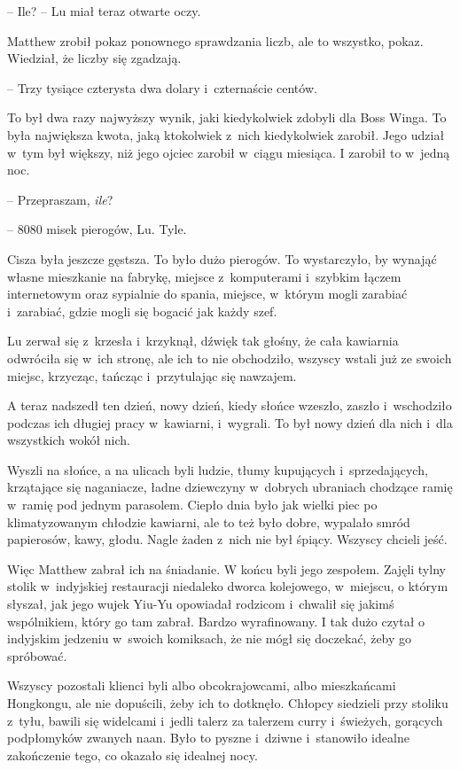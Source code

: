 \documentclass[oneside,polish,11pt,rmheadings]{mwbk}
\begin{document}
-- Ile? -- Lu miał teraz otwarte oczy. 


Matthew zrobił pokaz ponownego sprawdzania liczb, ale to wszystko, pokaz. Wiedział, że liczby się zgadzają. 

-- Trzy tysiące czterysta dwa dolary i~czternaście centów. 

To był dwa razy najwyższy wynik, jaki kiedykolwiek zdobyli dla Boss Winga. To była największa kwota, jaką ktokolwiek z~nich kiedykolwiek zarobił. Jego udział w~tym był większy, niż jego ojciec zarobił w~ciągu miesiąca. I zarobił to w~jedną noc. 


-- Przepraszam, \textit{ile}?  


-- 8080 misek pierogów, Lu. Tyle.  


Cisza była jeszcze gęstsza. To było dużo pierogów. To wystarczyło, by wynająć własne mieszkanie na fabrykę, miejsce z~komputerami i~szybkim łączem internetowym oraz sypialnie do spania, miejsce, w~którym mogli zarabiać i~zarabiać, gdzie mogli się bogacić jak każdy szef. 


Lu zerwał się z~krzesła i~krzyknął, dźwięk tak głośny, że cała kawiarnia odwróciła się w~ich stronę, ale ich to nie obchodziło, wszyscy wstali już ze swoich miejsc, krzycząc, tańcząc i~przytulając się nawzajem. 


A teraz nadszedł ten dzień, nowy dzień, kiedy słońce wzeszło, zaszło i~wschodziło podczas ich długiej pracy w~kawiarni, i~wygrali. To był nowy dzień dla nich i~dla wszystkich wokół nich. 


Wyszli na słońce, a na ulicach byli ludzie, tłumy kupujących i~sprzedających, krzątające się naganiacze, ładne dziewczyny w~dobrych ubraniach chodzące ramię w~ramię pod jednym parasolem. Ciepło dnia było jak wielki piec po klimatyzowanym chłodzie kawiarni, ale to też było dobre, wypalało smród papierosów, kawy, głodu. Nagle żaden z~nich nie był śpiący. Wszyscy chcieli jeść. 


Więc Matthew zabrał ich na śniadanie. W końcu byli jego zespołem. Zajęli tylny stolik w~indyjskiej restauracji niedaleko dworca kolejowego, w~miejscu, o którym słyszał, jak jego wujek Yiu-Yu opowiadał rodzicom i~chwalił się jakimś wspólnikiem, który go tam zabrał. Bardzo wyrafinowany. I tak dużo czytał o indyjskim jedzeniu w~swoich komiksach, że nie mógł się doczekać, żeby go spróbować. 


Wszyscy pozostali klienci byli albo obcokrajowcami, albo mieszkańcami Hongkongu, ale nie dopuścili, żeby ich to dotknęło. Chłopcy siedzieli przy stoliku z~tyłu, bawili się widelcami i~jedli talerz za talerzem curry i~świeżych, gorących podpłomyków zwanych naan. Było to pyszne i~dziwne i~stanowiło idealne zakończenie tego, co okazało się idealnej nocy. 
\end{document}
